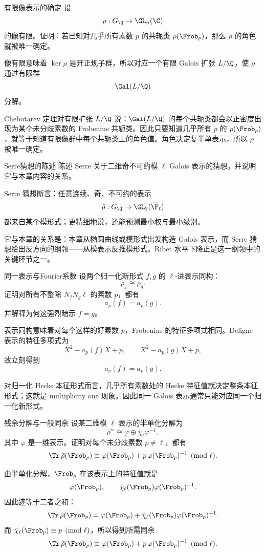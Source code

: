 \begin{problem}{有限像表示的确定}
\hard
设
\[
\rho:G_\Q\to\GL_n(\C)
\]
的像有限。证明：若已知对几乎所有素数 $p$ 的共轭类 $\rho(\Frob_p)$，那么 $\rho$ 的角色就被唯一确定。
\end{problem}
\begin{solution}
像有限意味着 $\ker\rho$ 是开正规子群，所以对应一个有限 Galois 扩张 $L/\Q$，使 $\rho$ 通过有限群
\[
\Gal(L/\Q)
\]
分解。

Chebotarev 定理对有限扩张 $L/\Q$ 说：$\Gal(L/\Q)$ 的每个共轭类都会以正密度出现为某个未分歧素数的 Frobenius 共轭类。因此只要知道几乎所有 $p$ 的 $\rho(\Frob_p)$，就等于知道有限像群中每个共轭类上的角色值。角色决定复半单表示，所以 $\rho$ 被唯一确定。
\end{solution}

\begin{problem}{Serre猜想的陈述}
\hard
陈述 Serre 关于二维奇不可约模 $\ell$ Galois 表示的猜想，并说明它与本章内容的关系。
\end{problem}
\begin{solution}
Serre 猜想断言：任意连续、奇、不可约的表示
\[
\bar\rho:G_\Q\to\GL_2(\overline{\F}_\ell)
\]
都来自某个模形式；更精细地说，还能预测最小权与最小级别。

它与本章的关系是：本章从椭圆曲线或模形式出发构造 Galois 表示，而 Serre 猜想给出反方向的纲领——从模表示反推模形式。Ribet 水平下降正是这一纲领中的关键环节之一。
\end{solution}

\begin{problem}{同一表示与Fourier系数}
\hard
设两个归一化新形式 $f,g$ 的 $\ell$-进表示同构：
\[
\rho_f\cong\rho_g.
\]
证明对所有不整除 $N_fN_g\ell$ 的素数 $p$，都有
\[
a_p(f)=a_p(g).
\]
并解释为何这强烈暗示 $f=g$。
\end{problem}
\begin{solution}
表示同构意味着对每个这样的好素数 $p$，Frobenius 的特征多项式相同。Deligne 表示的特征多项式为
\[
X^2-a_p(f)X+p,
\qquad
X^2-a_p(g)X+p,
\]
故立刻得到
\[
a_p(f)=a_p(g).
\]

对归一化 Hecke 本征形式而言，几乎所有素数处的 Hecke 特征值就决定整条本征形式；这就是 multiplicity one 现象。因此同一 Galois 表示通常只能对应同一个归一化新形式。
\end{solution}

\begin{problem}{残余分解与一般同余}
\hard
设某二维模 $\ell$ 表示的半单化分解为
\[
\bar\rho^{\mathrm{ss}}\cong \varphi\oplus \bar\chi_\ell\varphi^{-1},
\]
其中 $\varphi$ 是一维表示。证明对每个未分歧素数 $p\neq\ell$，都有
\[
\Tr\,\bar\rho(\Frob_p)
\equiv
\varphi(\Frob_p)+p\,\varphi(\Frob_p)^{-1}
\pmod\ell.
\]
\end{problem}
\begin{solution}
由半单化分解，$\Frob_p$ 在该表示上的特征值就是
\[
\varphi(\Frob_p),
\qquad
\bar\chi_\ell(\Frob_p)\varphi(\Frob_p)^{-1}.
\]
因此迹等于二者之和：
\[
\Tr\,\bar\rho(\Frob_p)=
\varphi(\Frob_p)+\bar\chi_\ell(\Frob_p)\varphi(\Frob_p)^{-1}.
\]
而 $\bar\chi_\ell(\Frob_p)\equiv p\pmod\ell$，所以得到所需同余
\[
\Tr\,\bar\rho(\Frob_p)
\equiv
\varphi(\Frob_p)+p\,\varphi(\Frob_p)^{-1}
\pmod\ell.
\]
\end{solution}

